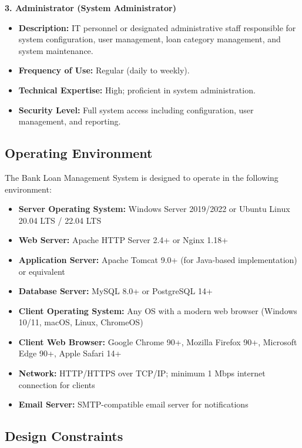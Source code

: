 \textbf{3. Administrator (System Administrator)}

\begin{itemize}
  \item \textbf{Description:} IT personnel or designated administrative staff responsible for system configuration, user management, loan category management, and system maintenance.
  \item \textbf{Frequency of Use:} Regular (daily to weekly).
  \item \textbf{Technical Expertise:} High; proficient in system administration.
  \item \textbf{Security Level:} Full system access including configuration, user management, and reporting.
\end{itemize}

\subsection{Operating Environment}

The Bank Loan Management System is designed to operate in the following environment:

\begin{itemize}
  \item \textbf{Server Operating System:} Windows Server 2019/2022 or Ubuntu Linux 20.04 LTS / 22.04 LTS
  \item \textbf{Web Server:} Apache HTTP Server 2.4+ or Nginx 1.18+
  \item \textbf{Application Server:} Apache Tomcat 9.0+ (for Java-based implementation) or equivalent
  \item \textbf{Database Server:} MySQL 8.0+ or PostgreSQL 14+
  \item \textbf{Client Operating System:} Any OS with a modern web browser (Windows 10/11, macOS, Linux, ChromeOS)
  \item \textbf{Client Web Browser:} Google Chrome 90+, Mozilla Firefox 90+, Microsoft Edge 90+, Apple Safari 14+
  \item \textbf{Network:} HTTP/HTTPS over TCP/IP; minimum 1 Mbps internet connection for clients
  \item \textbf{Email Server:} SMTP-compatible email server for notifications
\end{itemize}

\subsection{Design Constraints}


